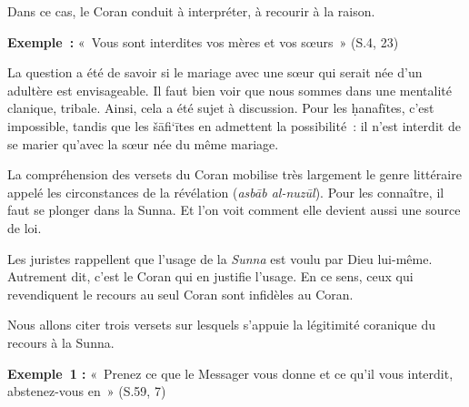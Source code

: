 
Dans ce cas, le Coran conduit à interpréter, à recourir à la raison.

\textbf{Exemple~:} «~Vous sont interdites vos mères et vos sœurs~» (S.4,
23)


La question a été de savoir si le mariage avec une sœur qui serait née
d'un adultère est envisageable. Il faut bien voir que nous sommes dans
une mentalité clanique, tribale. Ainsi, cela a été sujet à discussion.
Pour les ḥanafītes, c'est impossible, tandis que les šāfi`ītes en
admettent la possibilité~: il n'est interdit de se marier qu'avec la
sœur née du même mariage.

La compréhension des versets du Coran mobilise très largement le genre
littéraire appelé les circonstances de la révélation (\emph{asbāb
al-nuzūl}). Pour les connaître, il faut se plonger dans la Sunna. Et
l'on voit comment elle devient aussi une source de loi.


Les juristes rappellent que l'usage de la \emph{Sunna} est voulu par
Dieu lui-même. Autrement dit, c'est le Coran qui en justifie l'usage. En
ce sens, ceux qui revendiquent le recours au seul Coran sont infidèles
au Coran.


Nous allons citer trois versets sur lesquels s'appuie la légitimité
coranique du recours à la Sunna.

\textbf{Exemple~1 :} «~Prenez ce que le Messager vous donne et ce qu'il
vous interdit, abstenez-vous en~» (S.59, 7)

